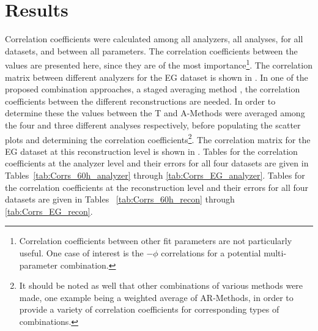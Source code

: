 
\graphicspath{{Body/Figures/Correlations/}}

\clearpage
\section{Results}


Correlation coefficients were calculated among all analyzers, all analyses, for all datasets, and between all parameters. The correlation coefficients between the \R values are presented here, since they are of the most importance\footnote{Correlation coefficients between other fit parameters are not particularly useful. One case of interest is the \R$-\phi$ correlations for a potential multi-parameter combination.}. The correlation matrix between different analyzers for the EG dataset is shown in . In one of the proposed combination approaches, a staged averaging method \cite{CombinationMeeting,DavidCollabTalk}, the correlation coefficients between the different reconstructions are needed. In order to determine these the \R values between the \RW T and A-Methods were averaged among the four and three different analyses respectively, before populating the scatter plots and determining the correlation coefficients\footnote{It should be noted as well that other combinations of various methods were made, one example being a weighted average of \RW AR-Methods, in order to provide a variety of correlation coefficients for corresponding types of combinations.}. The correlation matrix for the EG dataset at this reconstruction level is shown in . Tables for the correlation coefficients at the analyzer level and their errors for all four datasets are given in Tables~\ref{tab:Corrs_60h_analyzer} through \ref{tab:Corrs_EG_analyzer}. Tables for the correlation coefficients at the reconstruction level and their errors for all four datasets are given in Tables ~\ref{tab:Corrs_60h_recon} through \ref{tab:Corrs_EG_recon}.



